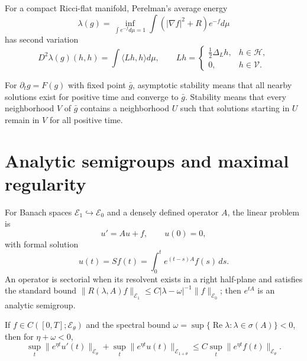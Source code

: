 \begin{proposition}
\label{prop:chow-iv-perelman-lambda-second-variation}
For a compact Ricci-flat manifold, Perelman's average energy
\[
 \lambda(g)=\inf_{\int e^{-f}d\mu=1}\int(|\nabla f|^2+R)e^{-f}d\mu
 \tag{35.8}
\]
has second variation
\[
 D^2\lambda(g)(h,h)=\int\langle Lh,h\rangle d\mu,
 \qquad
 Lh=\begin{cases}\frac12\Delta_Lh,&h\in\mathcal H,\\0,&h\in\mathcal V.
 \end{cases}
\]
\end{proposition}

\begin{definition}
\label{def:chow-iv-dynamic-stability}
For $\partial_tg=F(g)$ with fixed point $\bar g$, asymptotic stability means
that all nearby solutions exist for positive time and converge to $\bar g$.
Stability means that every neighborhood $V$ of $\bar g$ contains a neighborhood
$U$ such that solutions starting in $U$ remain in $V$ for all positive time.
\end{definition}

\section{Analytic semigroups and maximal regularity}

For Banach spaces $\mathcal E_1\hookrightarrow\mathcal E_0$ and a densely
defined operator $A$, the linear problem is
\begin{equation*}
 u'=Au+f,\qquad u(0)=0,
 \tag{35.10}
\end{equation*}
with formal solution
\begin{equation*}
 u(t)=Sf(t)=\int_0^t e^{(t-s)A}f(s)\,ds.
 \tag{35.11}
\end{equation*}
An operator is sectorial when its resolvent exists in a right half-plane and
satisfies the standard bound $\|R(\lambda,A)f\|_{\mathcal E_1}\le
C|\lambda-\omega|^{-1}\|f\|_{\mathcal E_0}$; then $e^{tA}$ is an analytic
semigroup.

\begin{proposition}
\label{prop:chow-iv-linear-maximal-regularity}
If $f\in C([0,T];\mathcal E_\theta)$ and the spectral bound
$\omega=\sup\{\operatorname{Re}\lambda:\lambda\in\sigma(A)\}<0$, then for
$\eta+\omega<0$,
\begin{equation*}
 \sup_t\|e^{\eta t}u'(t)\|_{\mathcal E_\theta}
 +\sup_t\|e^{\eta t}u(t)\|_{\mathcal E_{1+\theta}}
 \le C\sup_t\|e^{\eta t}f(t)\|_{\mathcal E_\theta}.
 \tag{35.12}
\end{equation*}
\end{proposition}

